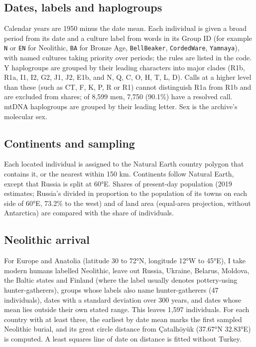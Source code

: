 \documentclass[11pt,a4paper]{article}
\begin{document}
\subsection{Dates, labels and haplogroups}
Calendar years are 1950 minus the date mean. Each individual is given a broad period from its date and a culture label from words in its Group ID (for example \texttt{N} or \texttt{EN} for Neolithic, \texttt{BA} for Bronze Age, \texttt{BellBeaker}, \texttt{CordedWare}, \texttt{Yamnaya}), with named cultures taking priority over periods; the rules are listed in the code. Y haplogroups are grouped by their leading characters into major clades (R1b, R1a, I1, I2, G2, J1, J2, E1b, and N, Q, C, O, H, T, L, D). Calls at a higher level than these (such as CT, F, K, P, R or R1) cannot distinguish R1a from R1b and are excluded from shares; of 8,599 men, 7,750 (90.1\%) have a resolved call. mtDNA haplogroups are grouped by their leading letter. Sex is the archive's molecular sex.

\subsection{Continents and sampling}
Each located individual is assigned to the Natural Earth country polygon that contains it, or the nearest within 150 km. Continents follow Natural Earth, except that Russia is split at 60°E. Shares of present-day population (2019 estimates; Russia's divided in proportion to the population of its towns on each side of 60°E, 73.2\% to the west) and of land area (equal-area projection, without Antarctica) are compared with the share of individuals.

\subsection{Neolithic arrival}
For Europe and Anatolia (latitude 30 to 72°N, longitude 12°W to 45°E), I take modern humans labelled Neolithic, leave out Russia, Ukraine, Belarus, Moldova, the Baltic states and Finland (where the label usually denotes pottery-using hunter-gatherers), groups whose labels also name hunter-gatherers (47 individuals), dates with a standard deviation over 300 years, and dates whose mean lies outside their own stated range. This leaves 1,597 individuals. For each country with at least three, the earliest by date mean marks the first sampled Neolithic burial, and its great circle distance from Çatalhöyük (37.67°N 32.83°E) is computed. A least squares line of date on distance is fitted without Turkey.
\end{document}
